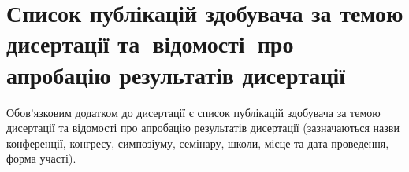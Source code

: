 
\chapter{Список публікацій здобувача за темою дисертації
  та~відомості~про апробацію результатів дисертації}

Обов'язковим додатком до дисертації є
список публікацій здобувача за темою дисертації
та відомості про апробацію результатів дисертації
(зазначаються назви конференції, конгресу, симпозіуму, семінару, школи,
місце та дата проведення, форма участі).

\repeatauthorpublications

\repeatapproval
